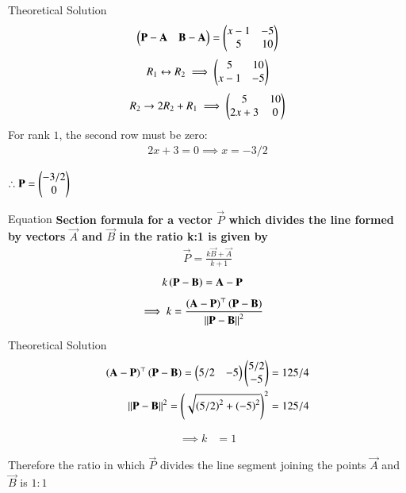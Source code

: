 \documentclass{beamer}
\begin{document}
\begin{frame}{Theoretical Solution}
\begin{align}
            \begin{pmatrix}\mathbf{P}-\mathbf{A}& \mathbf{B}-\mathbf{A}\end{pmatrix} = \begin{pmatrix}x-1 & -5\\5 & 10\end{pmatrix}
		\end{align}
\begin{align}
R_1 \leftrightarrow R_2 \implies \begin{pmatrix}5 & 10\\x-1 & -5\end{pmatrix}
\end{align}
\begin{align}
R_2 \rightarrow 2R_2 + R_1 \implies \begin{pmatrix}5 & 10\\2x+3 & 0\end{pmatrix}
\end{align}
For rank $1$, the second row must be zero:
\begin{align}
    2x+3=0 \implies x=-3/2
\end{align}
\begin{center}
$\therefore \vec{P}=\begin{myvec}{-3/2\\0}\end{myvec}$
\end{center}
\end{frame}

\begin{frame}{Equation}
\textbf{Section formula for a vector $\vec{P}$ which divides the line formed by vectors $\vec{A}$ and $\vec{B}$ in the ratio k:1 is given by}
\begin{align}
    \vec{P}=\frac{k\vec{B}+\vec{A}}{k+1}
\end{align}
\begin{align}
			k\left(\mathbf{P}-\mathbf{B}\right)&= \mathbf{A}-\mathbf{P}
\end{align}
\begin{align}
			\implies k &=
			\frac{\left(\mathbf{A}-\mathbf{P}\right)^{\top}\left(\mathbf{P}-\mathbf{B}\right)}{\left\lVert\mathbf{P}-\mathbf{B}\right\rVert^2}
			\label{eq:section_formula-k}
\end{align}
\end{frame}
\begin{frame}{Theoretical Solution}
\begin{align}
\left(\mathbf{A}-\mathbf{P}\right)^{\top}\left(\mathbf{P}-\mathbf{B}\right) = \begin{pmatrix}5/2 & -5\end{pmatrix}\begin{pmatrix}5/2\\-5\end{pmatrix} = 125/4\\
{\left\lVert\mathbf{P}-\mathbf{B}\right\rVert^2} = \left(\sqrt{\left(5/2\right)^2 + \left(-5\right)^2}\right)^2 = 125/4
\end{align}

\begin{align}
\implies k &= 1
\end{align}

Therefore the ratio in which $\vec{P}$ divides the line segment joining the points $\vec{A}$ and $\vec{B}$ is $1:1$\\
\end{frame}
\end{document}
